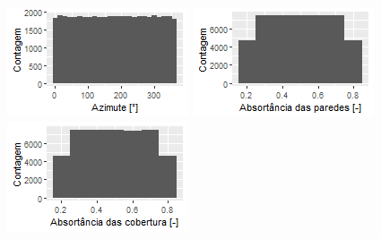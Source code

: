\documentclass{article}
\begin{document}
\begin{figure}[h!]
\begin{minipage}{.33\textwidth}
	\end{minipage}
	\centering
	\begin{minipage}{.33\textwidth}
		\centering
		\includegraphics[width=\linewidth]{plot_azimute.png}
	\end{minipage}%
	\begin{minipage}{.33\textwidth}
		\centering
		\includegraphics[width=\linewidth]{plot_abs_wall.png}
	\end{minipage}%
	\begin{minipage}{.33\textwidth}
		\centering
		\includegraphics[width=\linewidth]{plot_abs_roof.png}

\end{minipage}
\end{figure}
\end{document}
